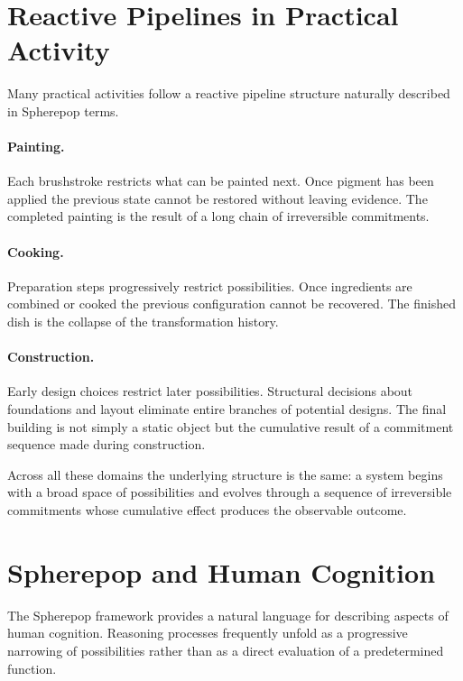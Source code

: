 \documentclass[12pt]{article}
\begin{document}
\section{Reactive Pipelines in Practical Activity}
\label{sec:pipelines}

Many practical activities follow a reactive pipeline structure naturally described in Spherepop terms.

\paragraph{Painting.} Each brushstroke restricts what can be painted next. Once pigment has been applied the previous state cannot be restored without leaving evidence. The completed painting is the result of a long chain of irreversible commitments.

\paragraph{Cooking.} Preparation steps progressively restrict possibilities. Once ingredients are combined or cooked the previous configuration cannot be recovered. The finished dish is the collapse of the transformation history.

\paragraph{Construction.} Early design choices restrict later possibilities. Structural decisions about foundations and layout eliminate entire branches of potential designs. The final building is not simply a static object but the cumulative result of a commitment sequence made during construction.

Across all these domains the underlying structure is the same: a system begins with a broad space of possibilities and evolves through a sequence of irreversible commitments whose cumulative effect produces the observable outcome.

\section{Spherepop and Human Cognition}
\label{sec:cognition}

The Spherepop framework provides a natural language for describing aspects of human cognition. Reasoning processes frequently unfold as a progressive narrowing of possibilities rather than as a direct evaluation of a predetermined function.
\end{document}
